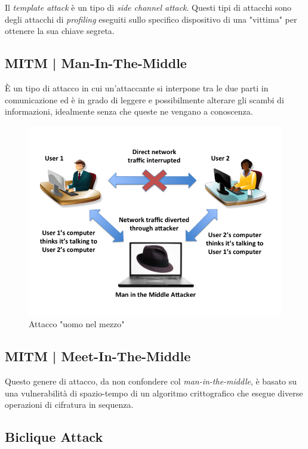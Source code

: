 \textsf{\small Il \emph{template attack} è un tipo di \emph{side channel attack}. Questi tipi di attacchi sono degli attacchi di \emph{profiling} eseguiti sullo specifico dispositivo di una "vittima" per ottenere la sua chiave segreta. }

\subsection{MITM | Man-In-The-Middle}

 

\textsf{\small È un tipo di attacco in cui un'attaccante si interpone tra le due parti in comunicazione ed è in grado di leggere e possibilmente alterare gli scambi di informazioni, idealmente senza che queste ne vengano a conoscenza. } %

\begin{figure}[H]
	\centering
	\includegraphics[width=.6\textwidth, height=.6\textheight, keepaspectratio]{./images/attacks/man_in_the_middle.png}
	\caption{Attacco "uomo nel mezzo"}
	\label{fig:man_in_the_middle}
\end{figure}

\subsection{MITM | Meet-In-The-Middle}

 

\textsf{\small Questo genere di attacco, da non confondere col \emph{man-in-the-middle}, è basato su una vulnerabilità di spazio-tempo di un algoritmo crittografico che esegue diverse operazioni di cifratura in sequenza.}

\subsection{Biclique Attack}

